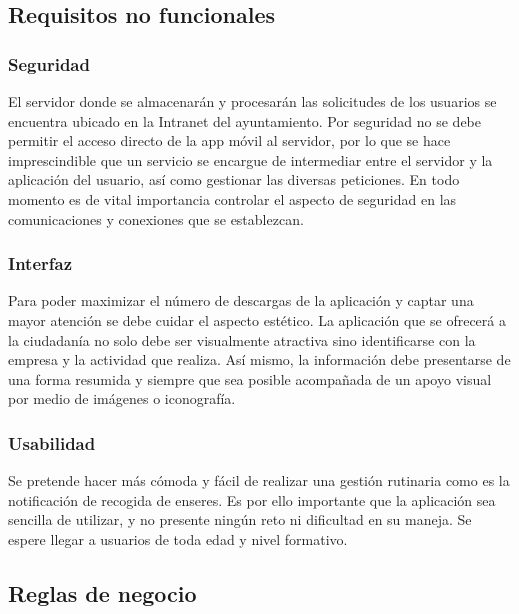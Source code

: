 \subsection{Requisitos no funcionales}
\subsubsection*{Seguridad}
El servidor donde se almacenarán y procesarán las solicitudes de los usuarios se encuentra ubicado en la Intranet del ayuntamiento. Por seguridad no se debe permitir el acceso directo de la app móvil al servidor, por lo que se hace imprescindible que un servicio se encargue de intermediar entre el servidor y la aplicación del usuario, así como gestionar las diversas peticiones. En todo momento es de vital importancia controlar el aspecto de seguridad en las comunicaciones y conexiones que se establezcan. 

\subsubsection*{Interfaz}
Para poder maximizar el número de descargas de la aplicación y captar una mayor atención se debe cuidar el aspecto estético. La aplicación que se ofrecerá a la ciudadanía no solo debe ser visualmente atractiva sino identificarse con la empresa y la actividad que realiza. Así mismo, la información debe presentarse de una forma resumida y siempre que sea posible acompañada de un apoyo visual por medio de imágenes o iconografía.

\subsubsection{Usabilidad}
Se pretende hacer más cómoda  y fácil de realizar una gestión rutinaria como es la notificación de recogida de enseres. Es por ello importante que la aplicación sea sencilla de utilizar, y no presente ningún reto ni dificultad en su maneja. Se espere llegar a usuarios de toda edad y nivel formativo. 

\subsection{Reglas de negocio}
		

